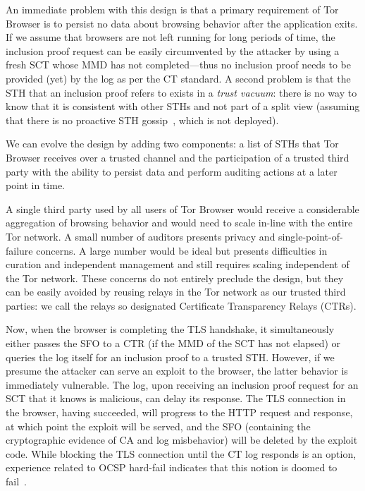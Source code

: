 An immediate problem with this design is that a primary requirement of Tor
Browser is to persist no data about browsing behavior after the application
exits. If we assume that browsers are not left running for long periods of time,
the inclusion proof request can be easily circumvented by the attacker by using
a fresh SCT whose MMD has not completed---thus no inclusion proof needs to be
provided (yet) by the log as per the CT standard. A second problem is that the
STH that an inclusion proof refers to exists in a \emph{trust vacuum}:
	there is no way to know that it is consistent with other STHs and not part
	of a split view (assuming that there is no proactive STH
	gossip~\cite{syta,dahlberg}, which is not deployed).

We can evolve the design by adding two components: a list of STHs that Tor
Browser receives over a trusted channel and the participation of a trusted third
party with the ability to persist data and perform auditing actions at a later
point in time.

A single third party used by all users of Tor Browser would receive a
considerable aggregation of browsing behavior and would need to scale in-line
with the entire Tor network. A small number of auditors presents privacy and
single-point-of-failure concerns. A large number would be ideal but presents
difficulties in curation and independent management and still requires scaling
independent of the Tor network. These concerns do not entirely preclude the
design, but they can be easily avoided by reusing relays in the Tor network as
our trusted third parties: we call the relays so designated Certificate
Transparency Relays (CTRs).

Now, when the browser is completing the TLS handshake, it simultaneously either
passes the SFO to a CTR (if the MMD of the SCT has not elapsed) or queries the
log itself for an inclusion proof to a trusted STH\@.  However, if we presume
the attacker can serve an exploit to the browser, the latter behavior is
immediately vulnerable. The log, upon receiving an inclusion proof request for
an SCT that it knows is malicious, can delay its response. The TLS connection in
the browser, having succeeded, will progress to the HTTP request and response,
at which point the exploit will be served, and the SFO (containing the
cryptographic evidence of CA and log misbehavior) will be deleted by the exploit
code. While blocking the TLS connection until the CT log responds is an option,
experience related to OCSP hard-fail indicates that this notion is doomed to
fail~\cite{no-hard-fail}.

